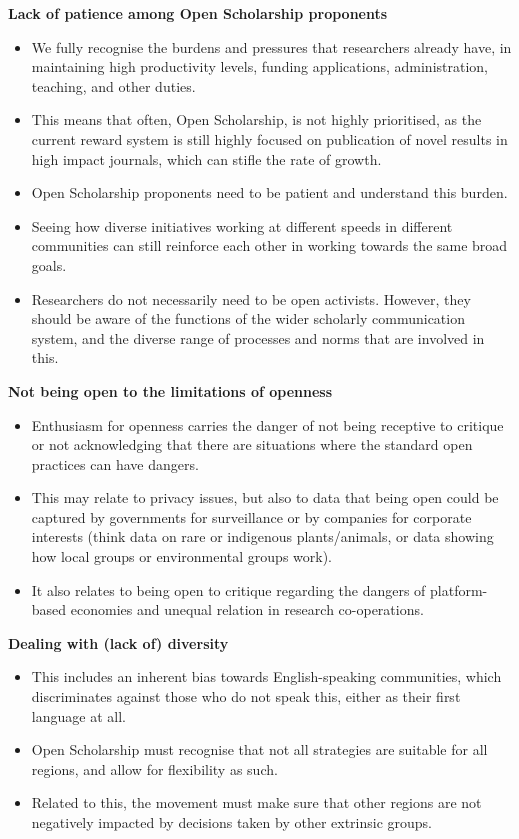 \textbf{Lack of patience among Open Scholarship proponents}

\begin{itemize}
\item
  We fully recognise the burdens and pressures that researchers already
  have, in maintaining high productivity levels, funding applications,
  administration, teaching, and other duties.
\item
  This means that often, Open Scholarship, is not highly prioritised, as
  the current reward system is still highly focused on publication of
  novel results in high impact journals, which can stifle the rate of
  growth.
\item
  Open Scholarship proponents need to be patient and understand this
  burden.
\item
  Seeing how diverse initiatives working at different speeds in
  different communities can still reinforce each other in working
  towards the same broad goals.
\item
  Researchers do not necessarily need to be open activists. However,
  they should be aware of the functions of the wider scholarly
  communication system, and the diverse range of processes and norms
  that are involved in this.
\end{itemize}

\textbf{Not being open to the limitations of openness}

\begin{itemize}
\item
  Enthusiasm for openness carries the danger of not being receptive to
  critique or not acknowledging that there are situations where the
  standard open practices can have dangers.
\item
  This may relate to privacy issues, but also to data that being open
  could be captured by governments for surveillance or by companies for
  corporate interests (think data on rare or indigenous plants/animals,
  or data showing how local groups or environmental groups work).
\item
  It also relates to being open to critique regarding the dangers of
  platform-based economies and unequal relation in research
  co-operations.
\end{itemize}

\textbf{Dealing with (lack of) diversity}

\begin{itemize}
\item
  This includes an inherent bias towards English-speaking communities,
  which discriminates against those who do not speak this, either as
  their first language at all.
\item
  Open Scholarship must recognise that not all strategies are suitable
  for all regions, and allow for flexibility as such.
\item
  Related to this, the movement must make sure that other regions are
  not negatively impacted by decisions taken by other extrinsic groups.
\end{itemize}

